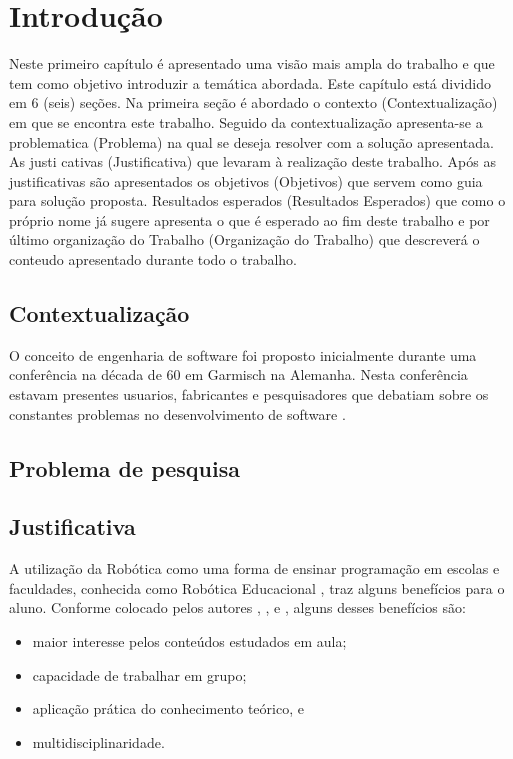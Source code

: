 \chapter[Introdução]{Introdução}
	Neste primeiro capítulo é apresentado uma visão mais ampla do trabalho e que tem como objetivo introduzir a temática abordada. Este capítulo está dividido em 6 (seis) seções. Na primeira seção é abordado o contexto (Contextualização) em que se encontra este trabalho. Seguido da contextualização apresenta-se a problematica (Problema) na qual se deseja resolver com a solução apresentada. As justi cativas (Justificativa) que levaram à realização deste trabalho. Após as justificativas são apresentados os objetivos (Objetivos) que servem como guia para solução proposta. Resultados esperados (Resultados Esperados) que como o próprio nome já sugere apresenta o que é esperado ao  fim deste trabalho e por último organização do Trabalho (Organização do Trabalho) que descreverá o conteudo apresentado durante todo o trabalho.


\section{Contextualização}
	O conceito de engenharia de software foi proposto inicialmente durante uma conferência na década de 60 em Garmisch na Alemanha. Nesta conferência estavam presentes usuarios, fabricantes e pesquisadores que debatiam sobre os constantes problemas no desenvolvimento de software \cite{Paduelli}.
	

\section{Problema de pesquisa}



\section{Justificativa}

	A utilização da Robótica como uma forma de ensinar programação em escolas e faculdades, conhecida como Robótica Educacional \cite{roboticaEducacionalAulasMatematica}, traz alguns benefícios para o aluno. Conforme colocado pelos autores \cite{teachingWithRoboticKit}, \cite{roboticEducationBasedLego}, \cite{roboticaEducacionalAulasMatematica} e \cite{evaluationRoboticEducationScale}, alguns desses benefícios são: 
	\begin{itemize}
		\item maior interesse pelos conteúdos estudados em aula;
		\item capacidade de trabalhar em grupo;
		\item aplicação prática do conhecimento teórico, e
		\item multidisciplinaridade.
	\end{itemize}
	 


